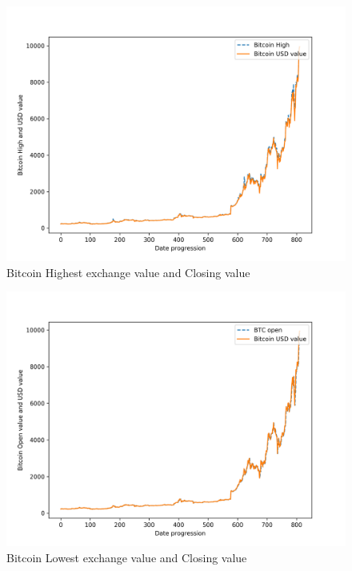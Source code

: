 \documentclass[sigconf]{acmart}
\begin{document}
\begin{figure}[!ht]
  \centering\includegraphics[width=\columnwidth]{images/High.png}
  \caption{Bitcoin Highest exchange value and Closing value}
  \label{2}
\end{figure}

\begin{figure}[!ht]
  \centering\includegraphics[width=\columnwidth]{images/Open.png}
  \caption{Bitcoin Lowest exchange value and Closing value }
  \label{3}
\end{figure}
\end{document}
